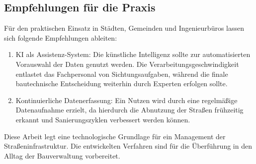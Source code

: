 \subsection{Empfehlungen für die Praxis}
\label{subsec:empfehlungen}

Für den praktischen Einsatz in Städten, Gemeinden und Ingenieurbüros lassen sich folgende Empfehlungen ableiten:
\begin{enumerate}
    \item KI als Assistenz-System: Die künstliche Intelligenz sollte zur automatisierten Vorauswahl der Daten genutzt werden. Die Verarbeitungsgeschwindigkeit entlastet das Fachpersonal von Sichtungsaufgaben, während die finale bautechnische Entscheidung weiterhin durch Experten erfolgen sollte.
    \item Kontinuierliche Datenerfassung: Ein Nutzen wird durch eine regelmäßige Datenaufnahme erzielt, da hierdurch die Abnutzung der Straßen frühzeitig erkannt und Sanierungszyklen verbessert werden können.
\end{enumerate}

Diese Arbeit legt eine technologische Grundlage für ein Management der Straßeninfrastruktur. Die entwickelten Verfahren sind für die Überführung in den Alltag der Bauverwaltung vorbereitet.
